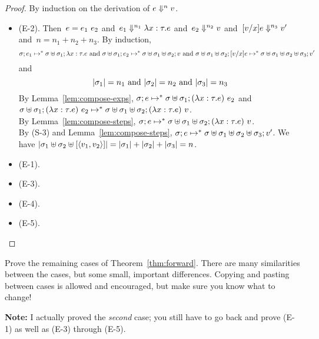 \documentclass{article}
\begin{document}
\begin{proof}
  By induction on the derivation of $\eval[n]{e}{v}$.
  \begin{itemize}
    
  \item (E-2).
    Then~$e = \kwapp{e_1}{e_2}$
    and~$\eval[n_1]{e_1}{\kwfun{x}{\tau}{e}}$
    and~$\eval[n_2]{e_2}{v}$
    and~$\eval[n_3]{\sub{v}{x}{e}}{v'}$ and~$n = n_1 + n_2 + n_3$.
    By induction,
    \[
    \cfg{\store}{e_1} \step^*
    \cfg{\stjoin{\store}{\store_1}}{\kwfun{x}{\tau}{e}}
    \text{~and~}\cfg{\stjoin{\store}{\store_1}}{e_2} \step^*
    \cfg{\stjoin{\stjoin{\store}{\store_1}}{\store_2}}{v}
    \text{~and~}\cfg{\stjoin{\stjoin{\store}{\store_1}}{\store_2}}
    {\sub{v}{x}{e}} \step^*
    \cfg{\stjoin{\stjoin{\stjoin{\store}{\store_1}}{\store_2}}{\store_3}}
        {v'}
    \]
    and
    \[|\store_1| = n_1\text{~and~}|\store_2| = n_2\text{~and~}|\store_3| = n_3\]
    By Lemma~\ref{lem:compose-exps},
    $\cfg{\store}{e} \step^*
    \cfg{\stjoin{\store}{\store_1}}{\kwapp{(\kwfun{x}{\tau}{e})}{e_2}}$
    and~$\cfg{\stjoin{\store}{\store_1}}{\kwapp{(\kwfun{x}{\tau}{e})}{e_2}}
    \step^*
    \cfg{\stjoin{\stjoin{\store}{\store_1}}{\store_2}}
          {\kwapp{(\kwfun{x}{\tau}{e})}{v}}$.\\
          By Lemma~\ref{lem:compose-steps},
      $\cfg{\store}{e} \step^*
        \cfg{\stjoin{\stjoin{\store}{\store_1}}{\store_2}}
            {(\kwapp{\kwfun{x}{\tau}{e})}{v}}$.\\
      By (S-3) and Lemma~\ref{lem:compose-steps},
      $\cfg{\store}{e} \step^*
      \cfg{\stjoin{\stjoin{\stjoin{\store}{\store_1}}{\store_2}}{\store_3}}
          {v'}$.
          We have
      $|\stjoin{\store_1}{\stjoin{\store_2}{\stsing{\kwvpair{v_1}{v_2}}}}| =
      |\store_1| + |\store_2| + |\store_3| = n$.

\item (E-1).
\item (E-3).
\item (E-4).
\item (E-5).
  \end{itemize}
\end{proof}

\begin{task}
  Prove the remaining cases of Theorem~\ref{thm:forward}.
  There are many similarities between the cases, but some small, important
  differences. Copying and pasting between cases is allowed and encouraged,
  but make sure you know what to change!

  \textbf{Note:} I actually proved the {\em second} case; you still have
  to go back and prove (E-1) as well as (E-3) through (E-5).
\end{task}
\end{document}
